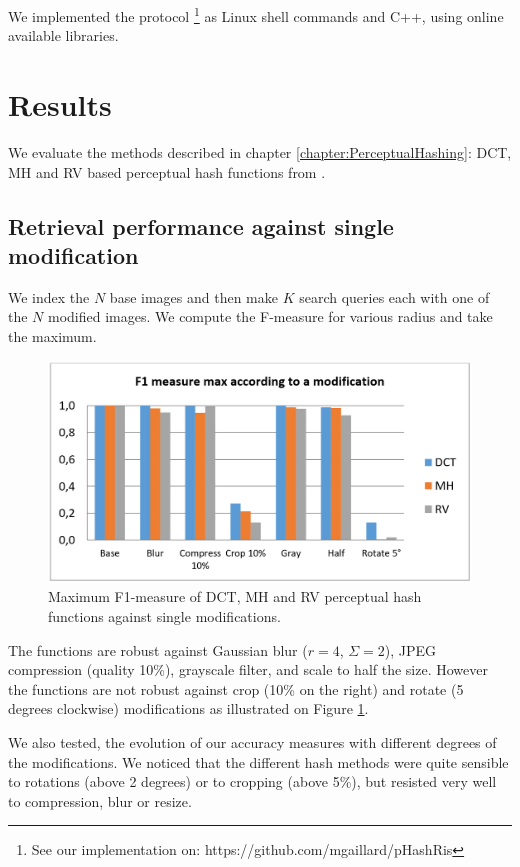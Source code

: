 We implemented the protocol \footnote{See our implementation on: https://github.com/mgaillard/pHashRis} as Linux shell commands and C++, using online available libraries.

\section{Results}
\label{chapter:Benchmarking:section:Results}
We evaluate the methods described in chapter \ref{chapter:PerceptualHashing}: DCT, MH and RV based perceptual hash functions from \cite{zauner2010implementation}. 

\subsection{Retrieval performance against single modification}
We index the $N$ base images and then make $K$ search queries each with one of the $N$ modified images. We compute the F-measure for various radius and take the maximum.

\begin{figure}
	\centering
	\includegraphics[width=\textwidth]{img/benchmark_single.png}
	\caption{Maximum F1-measure of DCT, MH and RV perceptual hash functions against single modifications.}
	\label{fig:benchmark_single}
\end{figure}

The functions are robust against Gaussian blur ($r=4$, $\Sigma=2$), JPEG compression (quality 10\%), grayscale filter, and scale to half the size. However the functions are not robust against crop (10\% on the right) and rotate (5 degrees clockwise) modifications as illustrated on Figure \ref{fig:benchmark_single}.

We also tested, the evolution of our accuracy measures with different degrees of the modifications. We noticed that the different hash methods were quite sensible to rotations (above 2 degrees) or to cropping (above 5\%), but resisted very well to compression, blur or resize.

